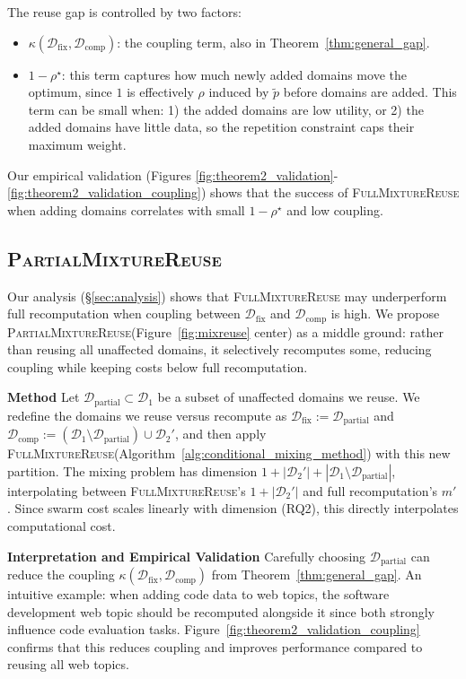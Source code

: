 \documentclass[table]{ai2style/ai2}
\newcommand{\D}[0]{\mathcal{D}}
\newcommand{\Dfix}[0]{\mathcal{D}_{\text{fix}}}
\newcommand{\Dcomp}[0]{\mathcal{D}_{\text{comp}}}
\newcommand{\Dpartial}[0]{\mathcal{D}_{\text{partial}}}
\newcommand{\fullmixreuse}[0]{\textsc{FullMixtureReuse}\xspace}
\newcommand{\partialmixreuse}[0]{\textsc{PartialMixtureReuse}\xspace}
\begin{document}
The reuse gap is controlled by two factors:
\begin{itemize}[itemsep=0pt,topsep=2pt,leftmargin=12pt]
    \item $\kappa(\Dfix, \Dcomp)$: the coupling term, also in Theorem~\ref{thm:general_gap}.
    \item $1 - \rho^\star$: this term captures how much newly added domains move the optimum, since $1$ is effectively $\rho$ induced by $\tilde{p}$ before domains are added. This term can be small when: 1) the added domains are low utility, or 2) the added domains have little data, so the repetition constraint caps their maximum weight.
\end{itemize}    

Our empirical validation (Figures \ref{fig:theorem2_validation}- \ref{fig:theorem2_validation_coupling}) shows that the success of \fullmixreuse when adding domains correlates with small $1-\rho^\star$ and low coupling.

\subsection{\partialmixreuse}
\label{sec:partial-reuse}

Our analysis (\S\ref{sec:analysis}) shows that \fullmixreuse may underperform full recomputation when coupling between $\Dfix$ and $\Dcomp$ is high. We propose \partialmixreuse (Figure~\ref{fig:mixreuse} center) as a middle ground: rather than reusing all unaffected domains, it selectively recomputes some, reducing coupling while keeping costs below full recomputation.

\textbf{Method} Let $\Dpartial \subset \D_1$ be a subset of unaffected domains we reuse. We redefine the domains we reuse versus recompute as $\Dfix := \Dpartial$ and $\Dcomp := (\D_1 \setminus \Dpartial) \cup \D_2'$, and then apply \fullmixreuse (Algorithm~\ref{alg:conditional_mixing_method}) with this new partition. The mixing problem has dimension $1 + |\D_2'| + |\D_1 \setminus \Dpartial|$, interpolating between \fullmixreuse's $1 + |\D_2'|$ and full recomputation's $m'$. Since swarm cost scales linearly with dimension (RQ2), this directly interpolates computational cost.

\textbf{Interpretation and Empirical Validation} Carefully choosing $\Dpartial$ can reduce the coupling $\kappa(\Dfix, \Dcomp)$ from Theorem~\ref{thm:general_gap}. 
An intuitive example: when adding code data to web topics, the software development web topic should be recomputed alongside it since both strongly influence code evaluation tasks. Figure~\ref{fig:theorem2_validation_coupling} confirms that this reduces coupling and improves performance compared to reusing all web topics.
\end{document}
